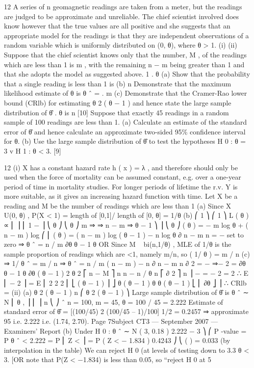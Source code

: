 \documentclass[a4paper,12pt]{article}
\begin{document}
12
A series of n geomagnetic readings are taken from a meter, but the readings are
judged to be approximate and unreliable. The chief scientist involved does know
however that the true values are all positive and she suggests that an appropriate
model for the readings is that they are independent observations of a random variable
which is uniformly distributed on (0, θ), where θ > 1.
(i)
(ii)
Suppose that the chief scientist knows only that the number, M , of the readings
which are less than 1 is m , with the remaining n − m being greater than 1 and
that she adopts the model as suggested above.
1
.
θ
(a) Show that the probability that a single reading is less than 1 is
(b) n
Demonstrate that the maximum likelihood estimate of θ is θ ˆ = .
m
(c) Demonstrate that the Cramer-Rao lower bound (CRlb) for estimating
θ 2 ( θ − 1 )
and hence state the large sample distribution of θ̂ .
θ is
n
[10]
Suppose that exactly 45 readings in a random sample of 100 readings are less
than 1.
(a) Calculate an estimate of the standard error of θ̂ and hence calculate an
approximate two-sided 95\% confidence interval for θ.
(b) Use the large sample distribution of θ̂ to test the hypotheses
H 0 : θ = 3 v H 1 : θ < 3.
[9]

12
(i)
X has a constant hazard rate h ( x ) = λ , and therefore should only be
used when the force of mortality can be assumed constant, e.g. over a
one-year period of time in mortality studies. For longer periods of
lifetime the r.v. Y is more suitable, as it gives an increasing hazard
function with time.
Let X be a reading and M be the number of readings which are less than 1
(a) Since X ~ U(0, θ) , P(X < 1) = length of [0,1]/ length of [0, θ] = 1/θ
(b) ⎛ 1 ⎞ ⎛ 1 ⎞
L ( θ ) ∝ ⎜ ⎟ ⎜ 1 − ⎟
⎝ θ ⎠ ⎝ θ ⎠
m
⇒
⇒
n − m
⇒
θ − 1 ⎞
⎟
⎝ θ ⎠
( θ ) = − m log θ + ( n − m ) log ⎛ ⎜
( θ ) = ( n − m ) log ( θ − 1 ) − n log θ
∂
n − m n
=
−
set to zero ⇒ θ ˆ = n / m
∂θ θ − 1 θ
OR Since M ~ bi(n,1/θ) , MLE of 1/θ is the sample proportion of
readings which are <1, namely m/n, so
( 1/ θ ) = m / n
(c)
⇒ 1/ θ ˆ = m / n ⇒ θ ˆ = n / m
( n − m ) − n
∂
n − m n
∂ 2
=
−
⇒− 2 =
∂θ θ − 1 θ
∂θ
( θ − 1 ) 2 θ 2
⎡ n − M ⎤ n n − n / θ n
⎡ ∂ 2 ⎤
n
⎥ −
=
− 2 = 2
∴ E ⎢ − 2 ⎥ = E ⎢
2
2
2
⎢ ⎣ ( θ − 1 ) ⎥ ⎦ θ
( θ − 1 ) θ θ ( θ − 1 )
⎣ ⎢ ∂θ ⎦ ⎥
∴ CRlb =
(ii)
(a)
θ 2 ( θ − 1 )
n
⎛ θ 2 ( θ − 1 ) ⎞
Large sample distribution of θ̂ is θ ˆ ∼ N ⎜ θ ,
⎟
⎜
⎟
n
⎝
⎠
ˆ
n = 100, m = 45, θ = 100 / 45 = 2.222
Estimate of standard error of
θ̂ = [(100/45) 2 (100/45 – 1)/100] 1/2 = 0.2457
⇒ approximate 95%
i.e. 2.222  i.e. (1.74, 2.70).
Page 7Subject CT3  — September 2007 — Examiners’ Report
(b)
Under H 0 : θ ˆ ∼ N ( 3, 0.18 )
2.222 − 3 ⎞
⎛
P -value = P θ ˆ < 2.222 = P ⎜ Z <
⎟ = P ( Z < − 1.834 )
0.4243 ⎠
⎝
(
)
= 0.033 (by interpolation in the table)
We can reject H 0 (at levels of testing down to 3.3%
θ < 3.
[OR note that P(Z < −1.834) is less than 0.05, so “reject H 0 at 5%
\end{document}
